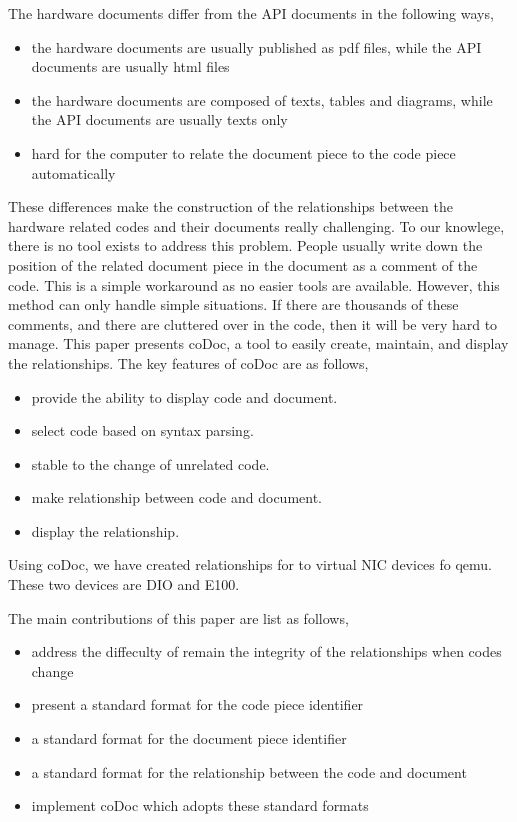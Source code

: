 \documentclass[11pt,letterpaper,oneside]{article}
\begin{document}
The hardware documents differ from the API documents in the following ways,
\begin{itemize}
\item the hardware documents are usually published as pdf files, while the API documents are usually html files
\item the hardware documents are composed of texts, tables and diagrams, while the API documents are usually texts only
\item hard for the computer to relate the document piece to the code piece automatically
\end{itemize}

These differences make the construction of the relationships between the hardware related codes and their documents really challenging.
To our knowlege, there is no tool exists to address this problem.
People usually write down the position of the related document piece in the document as a comment of the code.
This is a simple workaround as no easier tools are available.
However, this method can only handle simple situations.
If there are thousands of these comments, 
and there are cluttered over in the code,
then it will be very hard to manage.
This paper presents coDoc, a tool to easily create, maintain, and display the relationships.
The key features of coDoc are as follows,
\begin{itemize}
\item provide the ability to display code and document. 
\item select code based on syntax parsing.
\item stable to the change of unrelated code.
\item make relationship between code and document.
\item display the relationship.
\end{itemize}

Using coDoc, we have created relationships for to virtual NIC devices fo qemu.
These two devices are DIO and E100.

The main contributions of this paper are list as follows,
\begin{itemize}
\item address the diffeculty of remain the integrity of the relationships when codes change
\item present a standard format for the code piece identifier
\item a standard format for the document piece identifier
\item a standard format for the relationship between the code and document
\item implement coDoc which adopts these standard formats
\end{itemize}
\end{document}
